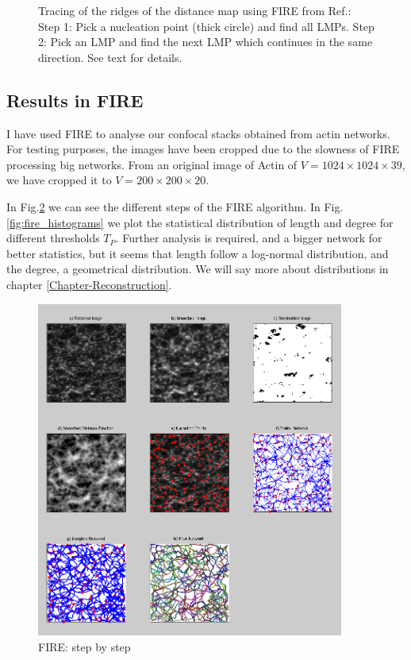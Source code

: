 \begin{figure}[h]
\caption[FIRE algorithm - Find LMP]{Tracing of the ridges of the distance
map using FIRE from Ref.\citep{stein_algorithm_2008}:  Step 1:
Pick a nucleation point (thick circle) and find all LMPs.  Step 2:
Pick an LMP and find the next LMP which continues in the same direction. See
text for details.}
\label{fig:fire_LMPS}
\end{figure}





 
 
\subsection{Results in FIRE}
 I have used FIRE to analyse our
 confocal stacks obtained from actin networks. For testing purposes, the images
have been cropped due to the slowness of FIRE
processing big networks. From an original image of Actin of
$V=1024\times1024\times39$, we have cropped it to $V=200\times200\times20$. 

In Fig.\ref{fig:fire_stepbystep} we can see the different steps of the FIRE
algorithm. In Fig.\ref{fig:fire_histograms} we plot the statistical distribution
of length and degree for different thresholds $T_P$. Further analysis is
required, and a bigger network for better statistics, but it seems that length
follow a log-normal distribution, and the degree, a geometrical distribution. We
will say more about distributions in chapter \ref{Chapter-Reconstruction}.

 \begin{figure}[h]

\begin{center}
\includegraphics[width=0.9\textwidth]{Figures/chapter-image/fire/fire012.png}%

\end{center}


\caption[Fire: Step by step for $T_P=0.12$]{FIRE: step by step}
\label{fig:fire_stepbystep}
\end{figure}

